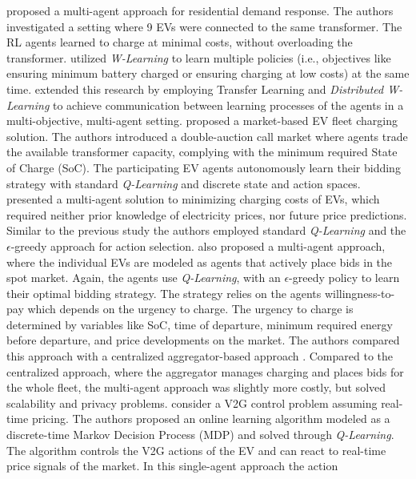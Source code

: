 \documentclass[12pt, article]{article}
\begin{document}
\textcite{dusparic13_multi} proposed a multi-agent approach for residential demand
response. The authors investigated a setting where 9  EVs were connected to the
same transformer. The RL agents learned to charge at minimal costs, without
overloading the transformer. \textcite{dusparic13_multi} utilized \emph{W-Learning} to
learn multiple policies (i.e., objectives like ensuring minimum battery charged
or ensuring charging at low costs) at the same time.
\textcite{taylor14_accel_learn_trans_learn} extended this research by employing
Transfer Learning and \emph{Distributed W-Learning} to achieve communication between
learning processes of the agents in a multi-objective, multi-agent setting.
\textcite{dauer13_market_based_ev_charg_coord} proposed a market-based EV fleet
charging solution. The authors introduced a double-auction call market where
agents trade the available transformer capacity, complying with the minimum
required State of Charge (SoC). The participating EV agents autonomously learn
their bidding strategy with standard \emph{Q-Learning} and discrete state and action
spaces. \textcite{giorgio13_elect_vehic} presented a multi-agent solution to
minimizing charging costs of EVs, which required neither prior knowledge of
electricity prices, nor future price predictions. Similar to the previous study
the authors employed standard \emph{Q-Learning} and the \(\epsilon\)-greedy approach for
action selection. \textcite{vaya14_optim} also proposed a multi-agent approach,
where the individual EVs are modeled as agents that actively place bids in the
spot market. Again, the agents use \emph{Q-Learning}, with an \(\epsilon\)-greedy policy
to learn their optimal bidding strategy. The strategy relies on the agents
willingness-to-pay which depends on the urgency to charge. The urgency to charge
is determined by variables like SoC, time of departure, minimum required energy
before departure, and price developments on the market. The authors compared
this approach with a centralized aggregator-based approach
\parencite{vaya15_optim_biddin_strat_plug_in}. Compared to the centralized
approach, where the aggregator manages charging and places bids for the whole
fleet, the multi-agent approach was slightly more costly, but solved scalability
and privacy problems. \textcite{shi11_real} consider a V2G control problem
assuming real-time pricing. The authors proposed an online learning algorithm
modeled as a discrete-time Markov Decision Process (MDP) and solved through
\emph{Q-Learning}. The algorithm controls the V2G actions of the EV and can react to
real-time price signals of the market. In this single-agent approach the action
\end{document}

